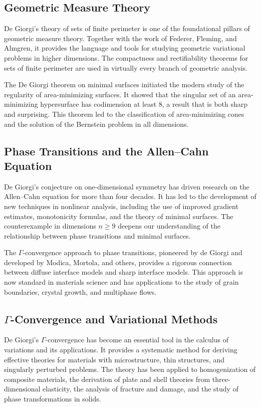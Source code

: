 \subsection{Geometric Measure Theory}

De Giorgi's theory of sets of finite perimeter is one of the foundational pillars of geometric measure theory. Together with the work of Federer, Fleming, and Almgren, it provides the language and tools for studying geometric variational problems in higher dimensions. The compactness and rectifiability theorems for sets of finite perimeter are used in virtually every branch of geometric analysis.

The De Giorgi theorem on minimal surfaces initiated the modern study of the regularity of area-minimizing surfaces. It showed that the singular set of an area-minimizing hypersurface has codimension at least 8, a result that is both sharp and surprising. This theorem led to the classification of area-minimizing cones and the solution of the Bernstein problem in all dimensions.

\subsection{Phase Transitions and the Allen--Cahn Equation}

De Giorgi's conjecture on one-dimensional symmetry has driven research on the Allen--Cahn equation for more than four decades. It has led to the development of new techniques in nonlinear analysis, including the use of improved gradient estimates, monotonicity formulas, and the theory of minimal surfaces. The counterexample in dimensions \(n \geq 9\) deepens our understanding of the relationship between phase transitions and minimal surfaces.

The \(\Gamma\)-convergence approach to phase transitions, pioneered by de Giorgi and developed by Modica, Mortola, and others, provides a rigorous connection between diffuse interface models and sharp interface models. This approach is now standard in materials science and has applications to the study of grain boundaries, crystal growth, and multiphase flows.

\subsection{\texorpdfstring{\(\Gamma\)}{Gamma}-Convergence and Variational Methods}

De Giorgi's \(\Gamma\)-convergence has become an essential tool in the calculus of variations and its applications. It provides a systematic method for deriving effective theories for materials with microstructure, thin structures, and singularly perturbed problems. The theory has been applied to homogenization of composite materials, the derivation of plate and shell theories from three-dimensional elasticity, the analysis of fracture and damage, and the study of phase transformations in solids.

